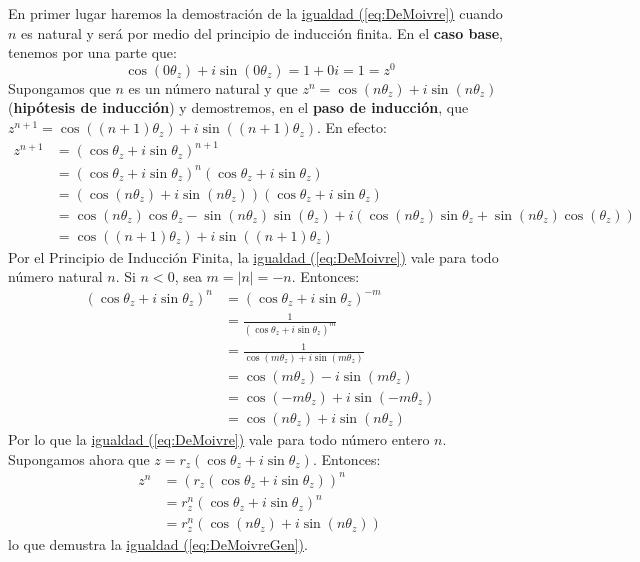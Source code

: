 \begin{solution}
  En primer lugar haremos la demostración de la
  \hyperref[eq:DeMoivre]{igualdad (\ref*{eq:DeMoivre})} cuando $n$ es
  natural y será por medio del principio de inducción finita. En el
  \textbf{caso base}, tenemos por una parte que:
  \begin{equation*}
    \cos(0\theta_{z})+i\sin(0\theta_{z})=1+0i=1=z^{0}
  \end{equation*}
  Supongamos que $n$ es un número natural y que
  $z^{n}=\cos(n\theta_{z})+i\sin(n\theta_{z})$ (\textbf{hipótesis de
    inducción}) y demostremos, en el \textbf{paso de inducción}, que
  $z^{n+1}=\cos((n+1)\theta_{z})+i\sin((n+1)\theta_{z})$. En efecto:
  \begin{align*}
    z^{n+1}&=(\cos\theta_{z}+i\sin\theta_{z})^{n+1}\\
           &=(\cos\theta_{z}+i\sin\theta_{z})^{n}(\cos\theta_{z}+i\sin\theta_{z})\\
           &=(\cos(n\theta_{z})+i\sin(n\theta_{z}))(\cos\theta_{z}+i\sin\theta_{z})\\
    &=\cos(n\theta_{z})
      \cos\theta_{z}-\sin(n\theta_{z})\sin(\theta_{z})
      +i(\cos(n\theta_{z})
      \sin\theta_{z}+\sin(n\theta_{z})\cos(\theta_{z}))\\
    &=\cos((n+1)\theta_{z})+i\sin((n+1)\theta_{z})
  \end{align*}
  Por el Principio de Inducción Finita, la
  \hyperref[eq:DeMoivre]{igualdad (\ref*{eq:DeMoivre})} vale para todo
  número natural $n$. Si $n<0$, sea $m=|n|=-n$. Entonces:
  \begin{align*}
    (\cos\theta_{z}+i\sin\theta_{z})^{n}&=(\cos\theta_{z}+i\sin\theta_{z})^{-m}\\
                                        &=\frac{1}{(\cos\theta_{z}+i\sin\theta_{z})^{m}}\\
                                        &=\frac{1}{\cos(m\theta_{z})+i\sin(m\theta_{z})}\\
                                        &=\cos(m\theta_{z})-i\sin(m\theta_{z})\\
                                        &=\cos(-m\theta_{z})+i\sin(-m\theta_{z})\\
    &=\cos(n\theta_{z})+i\sin(n\theta_{z})
  \end{align*}
  Por lo que la \hyperref[eq:DeMoivre]{igualdad (\ref*{eq:DeMoivre})}
  vale para todo número entero $n$. Supongamos ahora que
  $z=r_{z}(\cos\theta_{z}+i\sin\theta_{z})$. Entonces:
  \begin{align*}
    z^{n}&=(r_{z}(\cos\theta_{z}+i\sin\theta_{z}))^{n}\\
         &=r_{z}^{n}(\cos\theta_{z}+i\sin\theta_{z})^{n}\\
         &=r_{z}^{n}(\cos(n\theta_{z})+i\sin(n\theta_{z}))
  \end{align*}
  lo que demustra la \hyperref[eq:DeMoivreGen]{igualdad (\ref*{eq:DeMoivreGen})}.
\end{solution}

